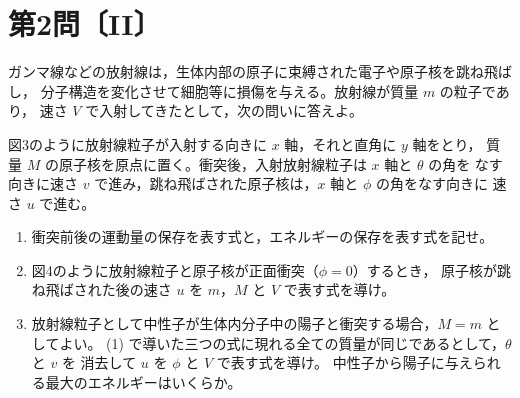 \section*{第2問〔II〕}

ガンマ線などの放射線は，生体内部の原子に束縛された電子や原子核を跳ね飛ばし，
分子構造を変化させて細胞等に損傷を与える。放射線が質量 $m$ の粒子であり，
速さ $V$ で入射してきたとして，次の問いに答えよ。

図3のように放射線粒子が入射する向きに $x$ 軸，それと直角に $y$ 軸をとり，
質量 $M$ の原子核を原点に置く。衝突後，入射放射線粒子は $x$ 軸と $\theta$ の角を
なす向きに速さ $v$ で進み，跳ね飛ばされた原子核は，$x$ 軸と $\phi$ の角をなす向きに
速さ $u$ で進む。

\begin{enumerate}[label=(\arabic*)]
  \item 衝突前後の運動量の保存を表す式と，エネルギーの保存を表す式を記せ。
  \item 図4のように放射線粒子と原子核が正面衝突（$\phi=0$）するとき，
        原子核が跳ね飛ばされた後の速さ $u$ を $m$，$M$ と $V$ で表す式を導け。
  \item 放射線粒子として中性子が生体内分子中の陽子と衝突する場合，$M=m$ としてよい。
        (1) で導いた三つの式に現れる全ての質量が同じであるとして，$\theta$ と $v$ を
        消去して $u$ を $\phi$ と $V$ で表す式を導け。
        中性子から陽子に与えられる最大のエネルギーはいくらか。
\end{enumerate}

